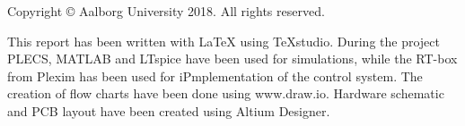 \thispagestyle{empty}
{\small
\strut\vfill %
\noindent Copyright \copyright{} Aalborg University 2018. All rights reserved.\par
\vspace{0.2cm}
\noindent This report has been written with \LaTeX{} using TeXstudio. During the project PLECS, MATLAB and LTspice have been used for simulations, while the RT-box from Plexim has been used for iPmplementation of the control system. The creation of flow charts have been done using www.draw.io. Hardware schematic and PCB layout have been created using Altium Designer.

}
\clearpage

